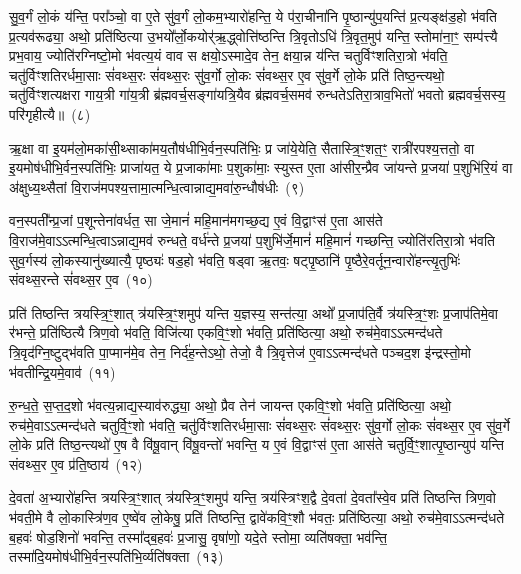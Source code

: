 सु॒व॒र्गं लो॒कं य॑न्ति॒ परा᳚ञ्चो॒ वा ए॒ते सु॑व॒र्गं लो॒कम॒भ्यारो॑हन्ति॒ ये प॑रा॒चीना॑नि पृ॒ष्ठान्यु॑प॒यन्ति॑ प्र॒त्यङ्क्ष॑ड॒हो भ॑वति प्र॒त्यव॑रूढ्या॒ अथो॒ प्रति॑ष्ठित्या उ॒भयो᳚र्लो॒कयोर्॑\mbox{}ऋ॒द्ध्वोत्ति॑ष्ठन्ति त्रि॒वृतो\-ऽधि॑ त्रि॒वृत॒मुप॑ यन्ति॒ स्तोमा॑ना॒ꣳ॒ सम्प॑त्त्यै प्रभ॒वाय॒ ज्योति॑रग्निष्टो॒मो भ॑वत्य॒यं वाव स क्षयो॒\-ऽस्मादे॒व तेन॒ क्षया॒न्न य॑न्ति चतुर्विꣳशतिरा॒त्रो भ॑वति॒ चतु॑र्विꣳशतिरर्धमा॒साः सं॑वथ्स॒रः सं॑वथ्स॒रः सु॑व॒र्गो लो॒कः सं॑वथ्स॒र ए॒व सु॑व॒र्गे लो॒के प्रति॑ तिष्ठ॒न्त्यथो॒ चतु॑र्विꣳशत्यक्षरा गाय॒त्री गा॑य॒त्री ब्र॑ह्मवर्च॒सङ्गा॑यत्रि॒यैव ब्र॑ह्मवर्च॒समव॑ रुन्धते\-ऽतिरा॒त्राव॒भितो॑ भवतो ब्रह्मवर्च॒सस्य॒ परि॑गृहीत्यै॥~(८)

{\anuvakamend[{म॒नु॒ष्य॑स्य मध्य॒तः प॒शव॒स्ताभ्या॑मे॒व सं॑वथ्स॒रश्चतु॑र्विꣳशतिश्च}]}%

ऋ॒क्षा वा इ॒यम॑लो॒मका॑सी॒थ्साका॑मय॒तौष॑धीभि॒र्वन॒स्पति॑भिः॒ प्र जा॑ये॒येति॒ सैतास्त्रि॒ꣳ॒शत॒ꣳ॒ रात्री॑रपश्य॒त्ततो॒ वा इ॒यमोष॑धीभि॒र्वन॒स्पति॑भिः॒ प्राजा॑यत॒ ये प्र॒जाका॑माः प॒शुका॑माः॒ स्युस्त ए॒ता आ॑सीर॒न्प्रैव जा॑यन्ते प्र॒जया॑ प॒शुभि॑रि॒यं वा अ॑क्षुध्य॒थ्सैतां वि॒राज॑मपश्य॒त्तामा॒त्मन्धि॒त्वान्नाद्य॒मवा॑रु॒न्धौष॑धीः~(९)

वन॒स्पती᳚न्प्र॒जां प॒शून्तेना॑वर्धत॒ सा जे॒मानं॑ महि॒मान॑मगच्छ॒द्य ए॒वं वि॒द्वाꣳस॑ ए॒ता आस॑ते वि॒राज॑मे॒वा\-ऽऽ\-त्मन्धि॒त्वा\-ऽन्नाद्य॒मव॑ रुन्धते॒ वर्ध॑न्ते प्र॒जया॑ प॒शुभि॑र्जे॒मानं॑ महि॒मानं॑ गच्छन्ति॒ ज्योति॑रतिरा॒त्रो भ॑वति सुव॒र्गस्य॑ लो॒कस्यानु॑\-ख्यात्यै॒ पृष्ठ्यः॑ षड॒हो भ॑वति॒ षड्वा ऋ॒तवः॒ षट्पृ॒ष्ठानि॑ पृ॒ष्ठैरे॒वर्तून॒न्वारो॑हन्त्यृ॒तुभिः॑ संवथ्स॒रन्ते सं॑वथ्स॒र ए॒व~(१०)

प्रति॑ तिष्ठन्ति त्रयस्त्रि॒ꣳ॒शात् त्र॑यस्त्रि॒ꣳ॒शमुप॑ यन्ति य॒ज्ञस्य॒ सन्त॑त्या॒ अथो᳚ प्र॒जा\-प॑ति॒र्वै त्र॑यस्त्रि॒ꣳ॒शः प्र॒जा\-प॑तिमे॒वा र॑भन्ते॒ प्रति॑ष्ठित्यै त्रिण॒वो भ॑वति॒ विजि॑त्या एकवि॒ꣳ॒शो भ॑वति॒ प्रति॑ष्ठित्या॒ अथो॒ रुच॑मे॒वा\-ऽऽ\-त्मन्द॑धते त्रि॒वृद॑ग्नि॒ष्टुद्भ॑वति पा॒प्मान॑मे॒व तेन॒ निर्द॑ह॒न्ते\-ऽथो॒ तेजो॒ वै त्रि॒वृत्तेज॑ ए॒वा\-ऽऽ\-त्मन्द॑धते पञ्चद॒श इ॑न्द्रस्तो॒मो भ॑वतीन्द्रि॒यमे॒वाव॑~(११)

रु॒न्ध॒ते॒ स॒प्त॒द॒शो भ॑वत्य॒न्नाद्य॒स्याव॑रुद्ध्या॒ अथो॒ प्रैव तेन॑ जायन्त एकवि॒ꣳ॒शो भ॑वति॒ प्रति॑ष्ठित्या॒ अथो॒ रुच॑मे॒वा\-ऽऽ\-त्मन्द॑धते चतुर्वि॒ꣳ॒शो भ॑वति॒ चतु॑र्विꣳशतिरर्धमा॒साः सं॑वथ्स॒रः सं॑वथ्स॒रः सु॑व॒र्गो लो॒कः सं॑वथ्स॒र ए॒व सु॑व॒र्गे लो॒के प्रति॑ तिष्ठ॒न्त्यथो॑ ए॒ष वै वि॑षू॒वान् वि॑षू॒वन्तो॑ भवन्ति॒ य ए॒वं वि॒द्वाꣳस॑ ए॒ता आस॑ते चतुर्वि॒ꣳ॒शात्पृ॒ष्ठान्युप॑ यन्ति संवथ्स॒र ए॒व प्र॑ति॒ष्ठाय॑~(१२)

दे॒वता॑ अ॒भ्यारो॑हन्ति त्रयस्त्रि॒ꣳ॒शात् त्र॑यस्त्रि॒ꣳ॒शमुप॑ यन्ति॒ त्रय॑स्त्रिꣳश॒द्वै दे॒वता॑ दे॒वता᳚स्वे॒व प्रति॑ तिष्ठन्ति त्रिण॒वो भ॑वती॒मे वै लो॒कास्त्रि॑ण॒व ए॒ष्वे॑व लो॒केषु॒ प्रति॑ तिष्ठन्ति॒ द्वावे॑कवि॒ꣳ॒शौ भ॑वतः॒ प्रति॑ष्ठित्या॒ अथो॒ रुच॑मे॒वा\-ऽऽ\-त्मन्द॑धते ब॒हवः॑ षोड॒शिनो॑ भवन्ति॒ तस्मा᳚द्ब॒हवः॑ प्र॒जासु॒ वृषा॑णो॒ यदे॒ते स्तोमा॒ व्यति॑षक्ता॒ भव॑न्ति॒ तस्मा॑दि॒यमोष॑धीभि॒र्वन॒स्पति॑भि॒र्व्यति॑षक्ता~(१३)

